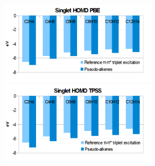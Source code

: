 \documentclass[journal=jctcce,manuscript=article]{achemso}
\begin{document}
\begin{figure}[h]
\includegraphics[width=8cm]{pbe_homo}
\includegraphics[width=8cm]{tpss_homo}
\end{figure}
\end{document}
